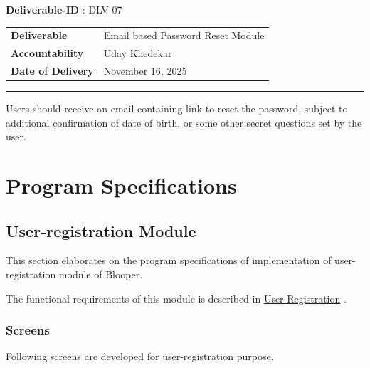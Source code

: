 \documentclass{article}%
\makeatletter
\renewcommand{\arraystretch}{1.5}%
\newcommand{\tinytosmall}{%
  \fontsize
    {\fpeval{(\f@size@tiny+\f@size@small)/2}}
    {\fpeval{(\f@baselineskip@tiny+\f@baselineskip@small)/2}}%
  \selectfont
}
\makeatother
\begin{document}
\hypertarget{ID:482026165}{}%
\begin{fancybox2}{\small \faChevronCircleRight \normalsize \xspace %
\tinytosmall%
\textbf{Deliverable{-}ID}%
: %
\xspace%
DLV{-}07%
\normalsize%
}%

\begin{tabularx}{\textwidth}{l X}
\rowcolor{lightapricot!50}%
\tinytosmall{\textbf{Deliverable}} & %
\tinytosmall{Email based Password Reset Module}%
\\%

\rowcolor{lightapricot!30} \tinytosmall{\textbf{Accountability}} & \tinytosmall{Uday Khedekar} \\
\rowcolor{lightapricot!10} \tinytosmall{\textbf{Date of Delivery}} & \tinytosmall{November 16, 2025} \\
\end{tabularx}%
\par%
\small%
\vspace{0.25\baselineskip}%
\rule{\textwidth}{0.4pt}%
\newline%
\vspace{0.25\baselineskip}%
\small%
Users should receive an email containing link to reset the password, subject to additional confirmation of date of birth, or some other secret questions set by the user.%
\normalsize%
\normalsize%
\end{fancybox2}%
\hypertarget{ID:76613715}{}%
\section{Program Specifications}%

%
\hypertarget{ID:1020423966}{}%
\subsection{User{-}registration Module}%

%
This section elaborates on the program specifications of implementation of user{-}registration module of Blooper.%
\par%
The functional requirements of this module is described in %
\hyperlink{ID:86526980}{User Registration}%
\xspace%
.%
\hypertarget{ID:851413676}{}%
\subsubsection{Screens}%

%
Following screens are developed for user{-}registration purpose.%
\hypertarget{ID:169009377}{}%
\end{document}
